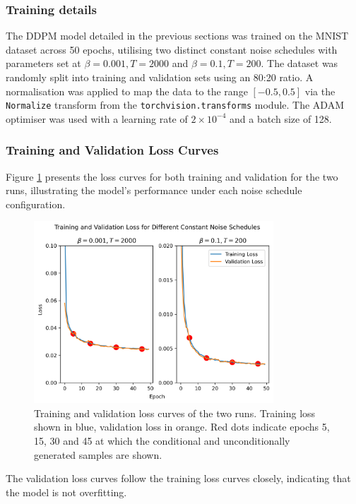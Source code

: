 \documentclass[11pt]{article}
\begin{document}
\subsubsection{Training details}

The DDPM model detailed in the previous sections was trained on the MNIST dataset across 50 epochs, utilising two distinct constant noise schedules with parameters set at $\beta = 0.001, T=2000$ and $\beta=0.1, T=200$. The dataset was randomly split into training and validation sets using an 80:20 ratio. A normalisation was applied to map the data to the range $[-0.5, 0.5]$ via the \texttt{Normalize} transform from the \texttt{torchvision.transforms} module. The ADAM optimiser was used with a learning rate of $2 \times 10^{-4}$ and a batch size of 128.
\subsubsection{Training and Validation Loss Curves}
Figure \ref{fig:q1b_loss_curves} presents the loss curves for both training and validation for the two runs, illustrating the model's performance under each noise schedule configuration.
\begin{figure}[H]
    \centering
    \includegraphics[width=0.8\textwidth]{figs/q1b_loss.png}
    \caption{Training and validation loss curves of the two runs. Training loss shown in blue, validation loss in orange. Red dots indicate epochs 5, 15, 30 and 45 at which the conditional and unconditionally generated samples are shown.}
    \label{fig:q1b_loss_curves}
\end{figure}

The validation loss curves follow the training loss curves closely, indicating that the model is not overfitting.
\end{document}
